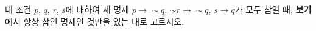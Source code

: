 네 조건 $p$, $q$, $r$, $s$에 대하여 세 명제 $p\longrightarrow \sim q$, $\sim r\longrightarrow \sim q$, $s\longrightarrow q$가 모두 참일 때, \textbf{보기}에서 항상 참인 명제인 것만을 있는 대로 고르시오. 
